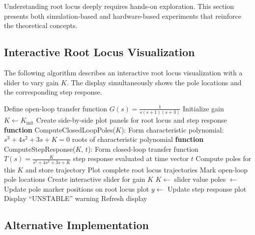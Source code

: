 Understanding root locus deeply requires hands-on exploration. This section presents both simulation-based and hardware-based experiments that reinforce the theoretical concepts.

\subsection{Interactive Root Locus Visualization}

The following algorithm describes an interactive root locus visualization with a slider to vary gain $K$. The display simultaneously shows the pole locations and the corresponding step response.

\begin{algorithm}
\caption{Interactive Root Locus Visualization}
\begin{algorithmic}[1]
\State Define open-loop transfer function $G(s) = \frac{1}{s(s+1)(s+3)}$
\State Initialize gain $K \gets K_{\text{init}}$
\State Create side-by-side plot panels for root locus and step response
\State \textbf{function} ComputeClosedLoopPoles($K$):
\State \hspace{1em} Form characteristic polynomial: $s^3 + 4s^2 + 3s + K = 0$
\State \hspace{1em} \Return roots of characteristic polynomial
\State \textbf{function} ComputeStepResponse($K$, $t$):
\State \hspace{1em} Form closed-loop transfer function $T(s) = \frac{K}{s^3 + 4s^2 + 3s + K}$
\State \hspace{1em} \Return step response evaluated at time vector $t$
\State Compute poles for this $K$ and store trajectory
\EndFor
\State Plot complete root locus trajectories
\State Mark open-loop pole locations
\State Create interactive slider for gain $K$
\State $K \gets$ slider value
\State poles $\gets$ 
\State Update pole marker positions on root locus plot
\State $y \gets$ 
\State Update step response plot
\State Display ``UNSTABLE'' warning
\EndIf
\State Refresh display
\EndWhile
\end{algorithmic}
\end{algorithm}

\subsection{Alternative Implementation}


